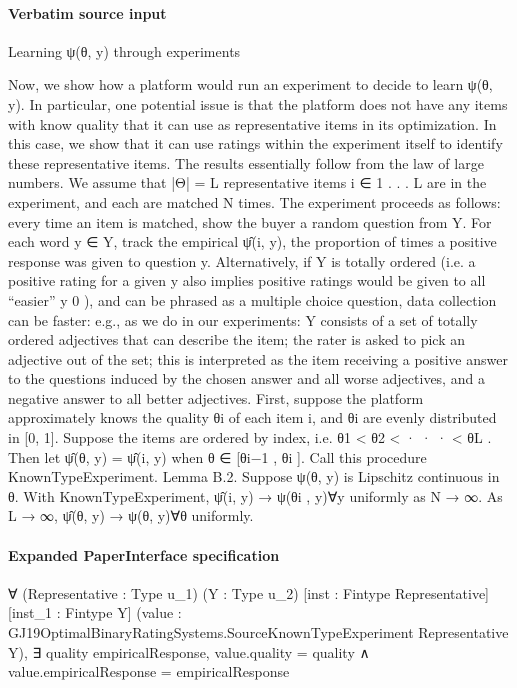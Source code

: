 \documentclass[10pt]{article}
\begin{document}
\paragraph{Verbatim source input}
\begin{ReviewVerbatim}
Learning ψ(θ, y) through experiments

Now, we show how a platform would run an experiment to decide to learn ψ(θ, y). In particular,
one potential issue is that the platform does not have any items with know quality that it can use
as representative items in its optimization. In this case, we show that it can use ratings within the
experiment itself to identify these representative items. The results essentially follow from the law
of large numbers.
We assume that |Θ| = L representative items i ∈ {1 . . . L} are in the experiment, and each are
matched N times. The experiment proceeds as follows: every time an item is matched, show the
buyer a random question from Y. For each word y ∈ Y, track the empirical ψ̂(i, y), the proportion
of times a positive response was given to question y. Alternatively, if Y is totally ordered (i.e. a
positive rating for a given y also implies positive ratings would be given to all “easier” y 0 ), and
can be phrased as a multiple choice question, data collection can be faster: e.g., as we do in our
experiments: Y consists of a set of totally ordered adjectives that can describe the item; the rater is
asked to pick an adjective out of the set; this is interpreted as the item receiving a positive answer
to the questions induced by the chosen answer and all worse adjectives, and a negative answer to
all better adjectives.
First, suppose the platform approximately knows the quality θi of each item i, and θi are evenly
distributed in [0, 1]. Suppose the items are ordered by index, i.e. θ1 < θ2 < · · · < θL . Then let
ψ̂(θ, y) = ψ̂(i, y) when θ ∈ [θi−1 , θi ]. Call this procedure KnownTypeExperiment.
Lemma B.2. Suppose ψ(θ, y) is Lipschitz continuous in θ. With KnownTypeExperiment, ψ̂(i, y) →
ψ(θi , y)∀y uniformly as N → ∞. As L → ∞, ψ̂(θ, y) → ψ(θ, y)∀θ uniformly.
\end{ReviewVerbatim}


\paragraph{Expanded PaperInterface specification}
\begin{ReviewVerbatim}
∀ (Representative : Type u_1) (Y : Type u_2) [inst : Fintype Representative] [inst_1 : Fintype Y]
  (value : GJ19OptimalBinaryRatingSystems.SourceKnownTypeExperiment Representative Y),
  ∃ quality empiricalResponse, value.quality = quality ∧ value.empiricalResponse = empiricalResponse
\end{ReviewVerbatim}
\end{document}
